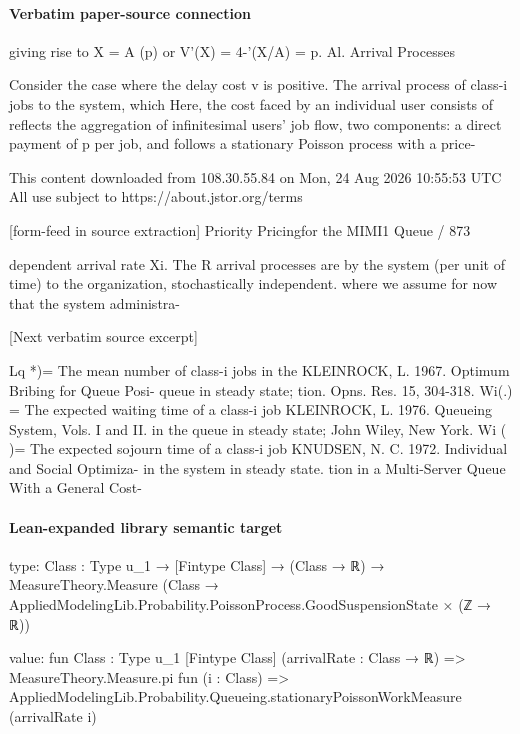 \documentclass[10pt]{article}
\begin{document}
\paragraph{Verbatim paper-source connection}
\begin{ReviewVerbatim}
giving rise to X = A (p) or V'(X) = 4-'(X/A) = p.                     Al. Arrival Processes

  Consider the case where the delay cost v is positive.               The arrival process of class-i jobs to the system, which
Here, the cost faced by an individual user consists of                reflects the aggregation of infinitesimal users' job flow,
two components: a direct payment of p per job, and                    follows a stationary Poisson process with a price-




                                                 This content downloaded from
                               108.30.55.84 on Mon, 24 Aug 2026 10:55:53 UTC
                                         All use subject to https://about.jstor.org/terms

[form-feed in source extraction]
                                                                                Priority Pricingfor the MIMI1 Queue / 873

dependent arrival rate Xi. The R arrival processes are                 by the system (per unit of time) to the organization,
stochastically independent.                                            where we assume for now that the system administra-

[Next verbatim source excerpt]

 Lq *)= The mean number of class-i jobs in the                          KLEINROCK, L. 1967. Optimum Bribing for Queue Posi-
         queue in steady state;                                              tion. Opns. Res. 15, 304-318.
Wi(.) = The expected waiting time of a class-i job                      KLEINROCK, L. 1976. Queueing System, Vols. I and II.
         in the queue in steady state;                                       John Wiley, New York.
 Wi ( )= The expected sojourn time of a class-i job                     KNUDSEN, N. C. 1972. Individual and Social Optimiza-
         in the system in steady state.                                      tion in a Multi-Server Queue With a General Cost-
\end{ReviewVerbatim}



\paragraph{Lean-expanded library semantic target}
\begin{ReviewVerbatim}
type:
{Class : Type u_1} →
  [Fintype Class] →
    (Class → ℝ) →
      MeasureTheory.Measure (Class → AppliedModelingLib.Probability.PoissonProcess.GoodSuspensionState × (ℤ → ℝ))

value:
fun {Class : Type u_1} [Fintype Class] (arrivalRate : Class → ℝ) =>
  MeasureTheory.Measure.pi fun (i : Class) =>
    AppliedModelingLib.Probability.Queueing.stationaryPoissonWorkMeasure (arrivalRate i)
\end{ReviewVerbatim}
\end{document}
